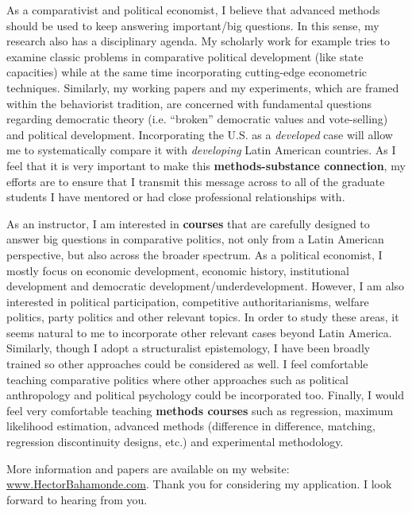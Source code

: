 \documentclass[10pt,stdletter,dateno,sigleft]{newlfm} %
\begin{document}
\begin{newlfm}
As a comparativist and political economist, I believe that advanced methods should be used to keep answering important/big questions. In this sense, my research also has a disciplinary agenda. My scholarly work for example tries to examine classic problems in comparative political development (like state capacities) while at the same time incorporating cutting-edge econometric techniques. Similarly, my working papers and my experiments, which are framed within the behaviorist tradition, are concerned with fundamental questions regarding democratic theory (i.e. ``broken'' democratic values and vote-selling) and political development. Incorporating the U.S. as a \emph{developed} case will allow me to systematically compare it with \emph{developing} Latin American countries. As I feel that it is very important to make this {\bf methods-substance connection}, my efforts are to ensure that I transmit this message across to all of the graduate students I have mentored or had close professional relationships with. 

As an instructor, I am interested in {\bf courses} that are carefully designed to answer big questions in comparative politics, not only from a Latin American perspective, but also across the broader spectrum. As a political economist, I mostly focus on economic development, economic history, institutional development and democratic development/underdevelopment. However, I am also interested in political participation, competitive authoritarianisms, welfare politics, party politics and other relevant topics. In order to study these areas, it seems natural to me to incorporate other relevant cases beyond Latin America. Similarly, though I adopt a structuralist epistemology, I have been broadly trained so other approaches could be considered as well. I feel comfortable teaching comparative politics where other approaches such as political anthropology and political psychology could be incorporated too. Finally, I would feel very comfortable teaching {\bf methods courses} such as regression, maximum likelihood estimation, advanced methods (difference in difference, matching, regression discontinuity designs, etc.) and experimental methodology.


More information and papers are available on my website: \href{http://www.hectorbahamonde.com}{www.HectorBahamonde.com}. Thank you for considering my application. I look forward to hearing from you.






\end{newlfm}
\end{document}
